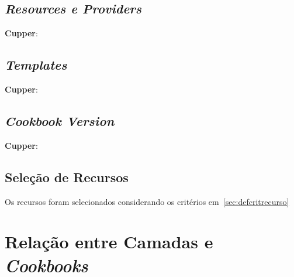 \subsection{\textit{Resources e Providers}}

\textbf{Cupper}:

\subsection{\textit{Templates}}

\textbf{Cupper}:

\subsection{\textit{Cookbook Version}}

\textbf{Cupper}:

\subsection{Seleção de Recursos}

Os recursos foram selecionados considerando os critérios em~\ref{sec:defcritrecurso}

\section{Relação entre Camadas e \textit{Cookbooks}}


